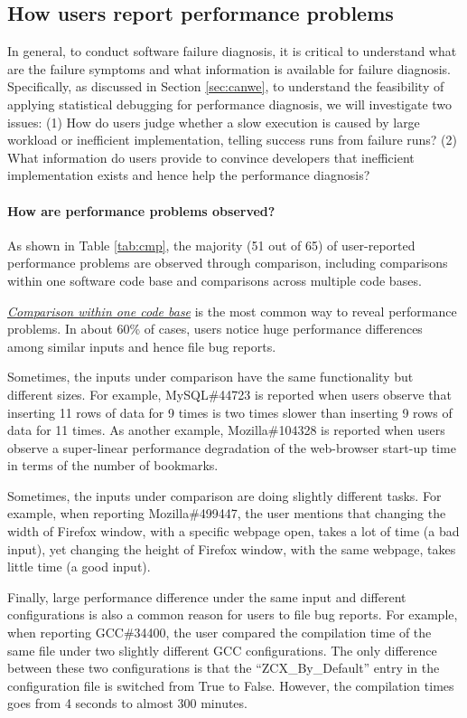 \subsection{How users report performance problems}
In general, to conduct software failure diagnosis, it is critical to understand 
what are the failure symptoms and what information is available for failure
diagnosis. 
Specifically, as discussed in Section \ref{sec:canwe}, to understand the
feasibility of applying statistical debugging for performance diagnosis, we
will investigate two issues: (1)
How do users judge whether a slow execution is caused by large workload or
inefficient implementation, telling success runs from failure
runs?
(2)
What information do users provide to convince developers that inefficient
implementation exists and hence help the performance diagnosis?

\paragraph{How are performance problems observed?}

As shown in Table \ref{tab:cmp}, the majority (51 out of 65) of user-reported 
performance problems are observed through comparison, including
comparisons within one software code base and comparisons across multiple code bases.

\underline{\it Comparison within one code base} 
is the most common way to reveal performance problems.  
In about 60\% of cases, 
users notice huge performance differences among
similar inputs and hence file bug reports.

Sometimes, the inputs under comparison have the same functionality but different
sizes. For example, MySQL\#44723 is reported when users observe that inserting
11 rows of data for 9 times is two times slower than inserting 9 rows of data
for 11 times. As another example, Mozilla\#104328 is reported when users observe
a super-linear performance degradation of the web-browser start-up time in terms
of the number of bookmarks.

Sometimes, the inputs under comparison are doing slightly different tasks.
For example, when reporting Mozilla\#499447, the user mentions that changing the width
of Firefox window, with a specific webpage open, takes a lot of time (a bad input), yet
changing the height of Firefox window, with the same webpage,
takes little time (a good 
input).

Finally, large performance difference under the same input and different
configurations is also a common reason for users to file bug reports.
For example, when reporting GCC\#34400, the user compared the compilation time
of the same file under two slightly different GCC configurations.
The only difference between these two configurations is that the ``ZCX\_By\_Default''
entry in the configuration file is switched from True to False. 
However, the compilation times goes from 4 seconds to almost 300 minutes.

